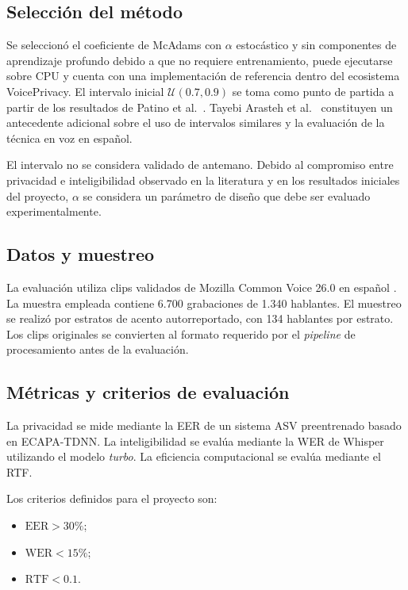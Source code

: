 \documentclass[10pt,twocolumn]{article}
\begin{document}
\subsection{Selección del método}

Se seleccionó el coeficiente de McAdams con $\alpha$ estocástico y sin
componentes de aprendizaje profundo debido a que no requiere entrenamiento,
puede ejecutarse sobre CPU y cuenta con una implementación de referencia dentro
del ecosistema VoicePrivacy. El intervalo inicial
$\mathcal{U}(0.7,0.9)$ se toma como punto de partida a partir de los resultados
de Patino et al.~\cite{patino2021}. Tayebi Arasteh et al.~\cite{tayebi2024}
constituyen un antecedente adicional sobre el uso de intervalos similares y la
evaluación de la técnica en voz en español.

El intervalo no se considera validado de antemano. Debido al compromiso entre
privacidad e inteligibilidad observado en la literatura y en los resultados
iniciales del proyecto, $\alpha$ se considera un parámetro de diseño que debe
ser evaluado experimentalmente.

\subsection{Datos y muestreo}

La evaluación utiliza clips validados de Mozilla Common Voice 26.0 en español
\cite{ardila2020}. La muestra empleada contiene 6.700 grabaciones de 1.340
hablantes. El muestreo se realizó por estratos de acento autorreportado, con 134
hablantes por estrato. Los clips originales se convierten al formato requerido
por el \textit{pipeline} de procesamiento antes de la evaluación.

\subsection{Métricas y criterios de evaluación}

La privacidad se mide mediante la EER de un sistema ASV preentrenado basado en
ECAPA-TDNN. La inteligibilidad se evalúa mediante la WER de Whisper utilizando
el modelo \textit{turbo}. La eficiencia computacional se evalúa mediante el
RTF.

Los criterios definidos para el proyecto son:

\begin{itemize}
    \item $\mathrm{EER} > 30\%$;
    \item $\mathrm{WER} < 15\%$;
    \item $\mathrm{RTF} < 0.1$.
\end{itemize}
\end{document}
